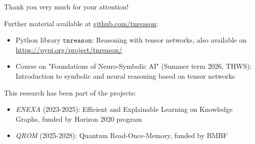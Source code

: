 \documentclass{beamer}
\begin{document}
%
%
%
%

    \begin{frame}{Thank you very much for your attention!}


        Further material available at {\url{github.com/tnreason}}:
        \begin{itemize}
            \item Python library $\mathtt{tnreason}$: Reasoning with tensor networks, also available on \url{https://pypi.org/project/tnreason/}
            \item Course on "Foundations of Neuro-Symbolic AI" (Summer term 2026, THWS): Introduction to symbolic and neural reasoning based on tensor networks
        \end{itemize}

        \medskip

        This research has been part of the projects:
        \begin{itemize}
            \item \emph{ENEXA} (2023-2025): Efficient and Explainable Learning on Knowledge Graphs, funded by Horizon 2020 program
            \item \emph{QROM} (2025-2028): Quantum Read-Once-Memory, funded by BMBF
        \end{itemize}


    \end{frame}
\end{document}
